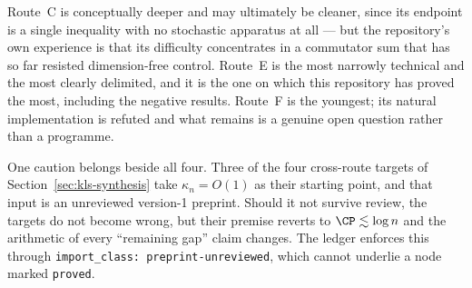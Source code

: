 \documentclass[../../main.tex]{subfiles}
\begin{document}
Route~C is conceptually deeper and may ultimately be cleaner, since its endpoint is a single
inequality with no stochastic apparatus at all --- but the repository's own experience is that its
difficulty concentrates in a commutator sum that has so far resisted dimension-free control.
Route~E is the most narrowly technical and the most clearly delimited, and it is the one on which
this repository has proved the most, including the negative results. Route~F is the youngest;
its natural implementation is refuted and what remains is a genuine open question rather than a
programme.

One caution belongs beside all four. Three of the four cross-route targets of
Section~\ref{sec:kls-synthesis} take $\kappa_n=O(1)$ as their starting point, and that input is an
unreviewed version-1 preprint. Should it not survive review, the targets do not become wrong, but
their premise reverts to $\CP\lesssim\log n$ and the arithmetic of every ``remaining gap'' claim
changes. The ledger enforces this through \texttt{import\_class: preprint-unreviewed}, which
cannot underlie a node marked \texttt{proved}.
\end{document}
